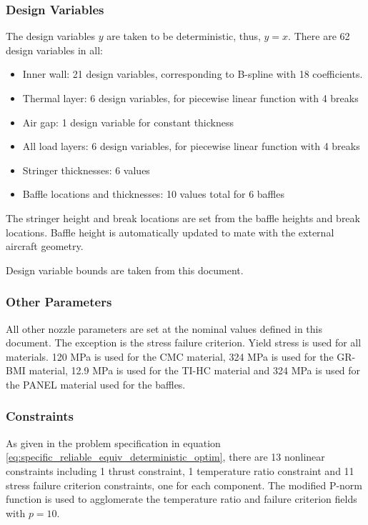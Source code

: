 \documentclass{article}
\begin{document}
\subsubsection{Design Variables}
The design variables $y$ are taken to be deterministic, thus, $y = x$. There are 62 design variables in all:

\begin{itemize}
\item Inner wall: 21 design variables, corresponding to B-spline with 18 coefficients.
\item Thermal layer: 6 design variables, for piecewise linear function with 4 breaks
\item Air gap: 1 design variable for constant thickness
\item All load layers: 6 design variables, for piecewise linear function with 4 breaks
\item Stringer thicknesses: 6 values
\item Baffle locations and thicknesses: 10 values total for 6 baffles
\end{itemize}

The stringer height and break locations are set from the baffle heights and break locations. Baffle height is automatically updated to mate with the external aircraft geometry.

Design variable bounds are taken from this document.

\subsubsection{Other Parameters}

All other nozzle parameters are set at the nominal values defined in this document. The exception is the stress failure criterion. Yield stress is used for all materials. 120 MPa is used for the CMC material, 324 MPa is used for the GR-BMI material, 12.9 MPa is used for the TI-HC material and 324 MPa is used for the PANEL material used for the baffles.

\subsubsection{Constraints}

As given in the problem specification in equation \ref{eq:specific_reliable_equiv_deterministic_optim}, there are 13 nonlinear constraints including 1 thrust constraint, 1 temperature ratio constraint and 11 stress failure criterion constraints, one for each component. The modified P-norm function is used to agglomerate the temperature ratio and failure criterion fields with $p = 10$.
\end{document}
